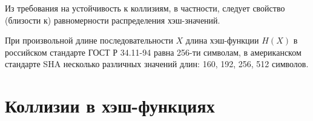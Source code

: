 Из требования на устойчивость к коллизиям, в частности, следует свойство (близости к) равномерности распределения хэш-значений.

При произвольной длине последовательности $X$ длина хэш-функции $H(X)$ в российском стандарте ГОСТ Р 34.11-94 равна 256-ти символам, в американском стандарте SHA несколько различных значений длин: 160, 192, 256, 512 символов.







\section{Коллизии в хэш-функциях}




